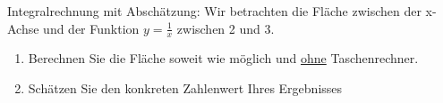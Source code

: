 \item Integralrechnung mit Abschätzung: Wir betrachten die Fläche zwischen der x-Achse und der Funktion $y=\frac{1}{x}$ zwischen 2 und 3.
\begin{enumerate}
\item Berechnen Sie die Fläche soweit wie möglich und \underline{ohne} Taschenrechner.
\item Schätzen Sie den konkreten Zahlenwert Ihres Ergebnisses
\end{enumerate}
